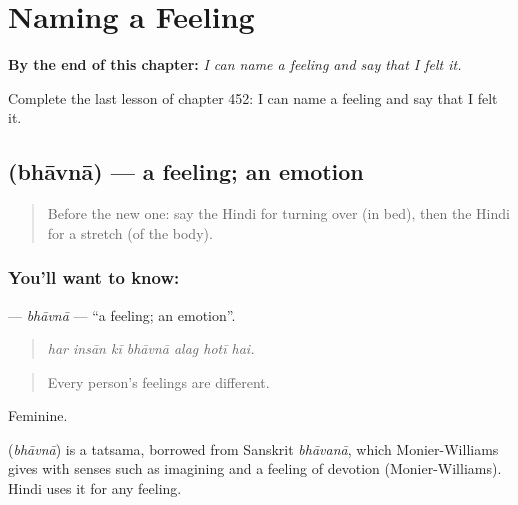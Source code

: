 
\chapter{Naming a Feeling}
\label{ch:hi-naming-a-feeling}

\begin{chapteropening}
\textbf{By the end of this chapter:} \emph{I can name a feeling and say that I felt it.}

Complete the last lesson of chapter 452: I can name a feeling and say that I felt it.
\end{chapteropening}

\section[\texorpdfstring{\hi{भावना} (bhāvnā)}{भावना (bhāvnā)}]{ (bhāvnā) — a feeling; an emotion}

\label{lesson:HI-C452-bhavna}



\begin{quote}
Before the new one: say the Hindi for turning over (in bed), then the Hindi for a stretch (of the body).
\end{quote}

\subsection*{You'll want to know: }
\textbf{} — \emph{bhāvnā} — \textquotedblleft{}a feeling; an emotion\textquotedblright{}.

\begin{quote}
      
\end{quote}

\begin{quote}
\emph{har insān kī bhāvnā alag hotī hai.}
\end{quote}

\begin{quote}
Every person's feelings are different.
\end{quote}

Feminine.

\begin{cousinweb}
\textbf{} (\emph{bhāvnā}) is a tatsama, borrowed from Sanskrit \emph{bhāvanā}, which Monier-Williams gives with senses such as imagining and a feeling of devotion (Monier-Williams). Hindi uses it for any feeling.
\end{cousinweb}

